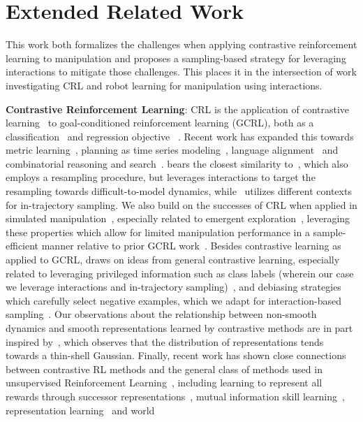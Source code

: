 \section{Extended Related Work} \label{app: rl}
This work both formalizes the challenges when applying contrastive reinforcement learning to manipulation and proposes a sampling-based strategy for leveraging interactions to mitigate those challenges. This places it in the intersection of work investigating CRL and robot learning for manipulation using interactions. 

\textbf{Contrastive Reinforcement Learning}: CRL is the application of contrastive learning~\citep{oord2018representation} to goal-conditioned reinforcement learning (GCRL), both as a classification~\citep{eysenbach2021clearning} and regression objective ~\citep{eysenbach2022contrastive}.  Recent work has expanded this towards metric learning~\citep{zheng2025multistep,myers2026offline}, planning as time series modeling~\citep{eysenbach2024inference}, language alignment~\citep{myers2023goal,myers2026temporal} and combinatorial reasoning and search~\citep{wang2026temporal,ziarko2026contrastive}. \methodname{} bears the closest similarity to~\citet{ziarko2026contrastive}, which also employs a resampling procedure, but \methodshort{} leverages interactions to target the resampling towards difficult-to-model dynamics, while~\citet{ziarko2026contrastive} utilizes different contexts for in-trajectory sampling. We also build on the successes of CRL when applied in simulated manipulation~\citep{wang20261000}, especially related to emergent exploration~\citep{liu2025single,bastankhah2026demystifying}, leveraging these properties which allow for limited manipulation performance in a sample-efficient manner relative to prior GCRL work~\citep{puterman1990markov,kaelbling1993learning,liu2022goal,andrychowicz2017hindsight,bai2021addressing}. Besides contrastive learning as applied to GCRL, \methodshort{} draws on ideas from general contrastive learning, especially related to leveraging privileged information such as class labels (wherein our case we leverage interactions and in-trajectory sampling)~\citep{feng2022adaptive,denize2023similarity,khosla2020supervised,hoffmann2022ranking}, and debiasing strategies which carefully select negative examples, which we adapt for interaction-based sampling~\citep{chuang2020debiased,huynh2022boosting,dwibedi2021little}. Our observations about the relationship between non-smooth dynamics and smooth representations learned by contrastive methods are in part inspired by~\citet{betser2026infonce}, which observes that the distribution of representations tends towards a thin-shell Gaussian. Finally, recent work has shown close connections between contrastive RL methods and the general class of methods used in unsupervised Reinforcement Learning~\citep{agarwal2025unified}, including learning to represent all rewards through successor representations~\citep{sikchi2026rlzero,zheng2026can,touati2021learning,agarwal2024proto,zheng2024contrastive}, mutual information skill learning~\citep{modirshanechi2026unifying,levy2025unsupervised}, representation learning~\citep{ferns2011bisimulation,zhang2020learning,rudolph2024learning} and world 
